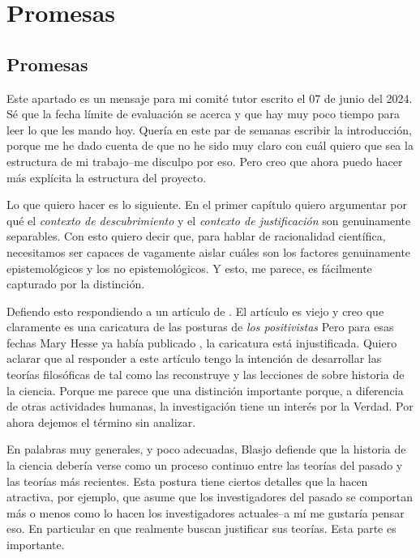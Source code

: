 \chapter{Promesas}

\section{Promesas}

\noindent Este apartado es un mensaje para mi comité tutor escrito el 07 de junio del 2024. Sé que la fecha límite de evaluación se acerca y que hay muy poco tiempo para leer lo que les mando hoy.
Quería en este par de semanas escribir la introducción, porque me he dado cuenta de que no he sido muy claro con cuál quiero que sea la estructura de mi trabajo--me disculpo por eso.
Pero creo que ahora puedo hacer más explícita la estructura del proyecto.

Lo que quiero hacer es lo siguiente.
En el primer capítulo quiero argumentar por qué el \emph{contexto de descubrimiento} y el \emph{contexto de justificación} son genuinamente separables.
Con esto quiero decir que, para hablar de racionalidad científica, necesitamos ser capaces de vagamente aislar cuáles son los factores genuinamente epistemológicos y los no epistemológicos.
Y esto, me parece, es fácilmente capturado por la distinción.

Defiendo esto respondiendo a un artículo de \textcite{Yturbe1995}.
El artículo es viejo y creo que claramente es una caricatura de las posturas de \emph{los positivistas}
Pero para esas fechas Mary Hesse ya había publicado , la caricatura está injustificada.
Quiero aclarar que  al responder a este artículo tengo la intención de desarrollar las teorías filosóficas de \textcite{Hessen2009, Grossmann2009} tal como las reconstruye \textcite{Freudenthal2009} y las lecciones de \textcite{blasjo2022} sobre historia de la ciencia.
Porque me parece que una distinción importante porque, a diferencia de otras actividades humanas, la investigación tiene un interés por la Verdad.
Por ahora dejemos el término sin analizar.

En palabras muy generales, y poco adecuadas, Blasjo defiende que la historia de la ciencia debería verse como un proceso continuo entre las teorías del pasado y las teorías más recientes.
Esta postura tiene ciertos detalles que la hacen atractiva, por ejemplo, que asume que los investigadores del pasado se comportan más o menos como lo hacen los investigadores actuales--a mí me gustaría pensar eso.
En particular en que realmente buscan justificar sus teorías.
Esta parte es importante.


